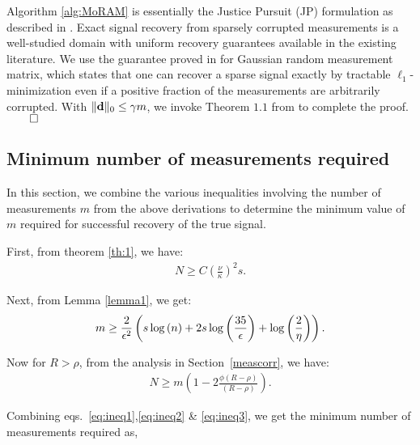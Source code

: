 {Algorithm \ref{alg:MoRAM} is essentially the Justice Pursuit (JP) formulation as described in \cite{Laska2009}. Exact signal recovery from sparsely corrupted measurements is a well-studied domain with uniform recovery guarantees available in the existing literature. We use the guarantee proved in \cite{li2013compressed} for Gaussian random measurement matrix, which states that one can recover a sparse signal exactly by tractable $\ell_1$-minimization even if a positive fraction of the measurements are arbitrarily corrupted. With $\|\mathbf{d}\|_0 \leq \gamma m$, we invoke Theorem $1.1$ from \cite{li2013compressed} to complete the proof.
$\qed$}

\subsection{Minimum number of measurements required}
In this section, we combine the various inequalities involving the number of measurements $m$ from the above derivations to determine the minimum value of $m$ required for successful recovery of the true signal.

First, from theorem \ref{th:1}, we have:
\begin{align}
N \geq C\left(\frac{\nu}{\kappa}\right)^2s.
\label{eq:ineq1}
\end{align}

Next, from Lemma \ref{lemma1}, we get:
\begin{align}
m \geq \frac{2}{\eps^2}\left(s\log{(n)} + 2s\log{\left(\frac{35}{\eps}\right)}+\log{\left(\frac{2}{\eta}\right)}\right).
\label{eq:ineq2}
\end{align}

Now for $R> \rho$, from the analysis in Section~\ref{meascorr}, we have:
\begin{align}
N \geq m \left(1-2\frac{\phi(R-\rho)}{(R-\rho)} \right).
\label{eq:ineq3}
\end{align}

Combining eqs.~\ref{eq:ineq1},\ref{eq:ineq2} \& \ref{eq:ineq3}, we get the minimum number of measurements required as,

